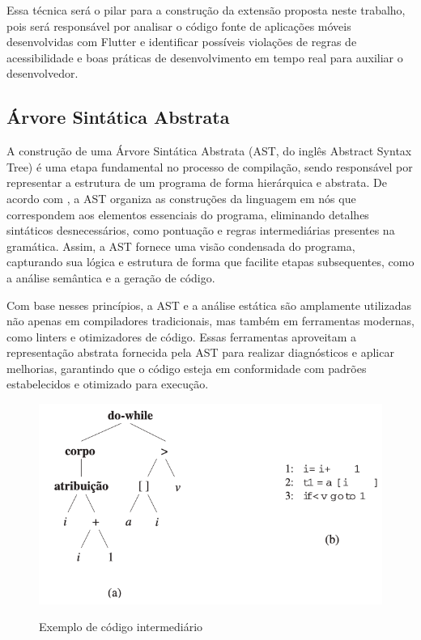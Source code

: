 Essa técnica será o pilar para a construção da extensão proposta neste trabalho, pois será responsável por analisar o código fonte de aplicações móveis desenvolvidas com Flutter e identificar possíveis violações de regras de acessibilidade e boas práticas de desenvolvimento em tempo real para auxiliar o desenvolvedor.

\subsection{Árvore Sintática Abstrata}

A construção de uma Árvore Sintática Abstrata (AST, do inglês Abstract Syntax Tree) é uma etapa fundamental no processo de compilação, sendo responsável por representar a estrutura de um programa de forma hierárquica e abstrata. De acordo com \cite{compiladores}, a AST organiza as construções da linguagem em nós que correspondem aos elementos essenciais do programa, eliminando detalhes sintáticos desnecessários, como pontuação e regras intermediárias presentes na gramática. Assim, a AST fornece uma visão condensada do programa, capturando sua lógica e estrutura de forma que facilite etapas subsequentes, como a análise semântica e a geração de código.

Com base nesses princípios, a AST e a análise estática são amplamente utilizadas não apenas em compiladores tradicionais, mas também em ferramentas modernas, como linters e otimizadores de código. Essas ferramentas aproveitam a representação abstrata fornecida pela AST para realizar diagnósticos e aplicar melhorias, garantindo que o código esteja em conformidade com padrões estabelecidos e otimizado para execução.

\pagebreak

\begin{figure}[!ht]
	\centering
  \caption[Código intermediário]{Exemplo de código intermediário \footnotemark}
	\includegraphics[width=350pt]{Assets/ExemploCompiladoresArvore.png}
	\label{fig:arvore-compiladores}
\end{figure}

